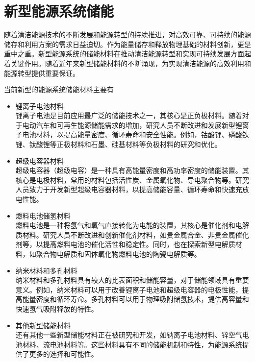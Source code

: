 \section{新型能源系统储能}
随着清洁能源技术的不断发展和能源转型的持续推进，对高效可靠、可持续的能源储存和利用方案的需求日益迫切。作为能量储存和释放物理基础的材料创新，更是重中之重。新型能源系统的储能材料在推动清洁能源转型和实现可持续发展方面起着关键作用。随着近年来新型储能材料的不断涌现，为实现清洁能源的高效利用和能源转型提供重要保证。 

当前新型的能源系统储能材料主要有%

\begin{itemize}
	\item 锂离子电池材料\\
锂离子电池是目前应用最广泛的储能技术之一，其核心是正负极材料。随着对于电动汽车和可再生能源储能需求的增加，研究人员不断改进和发展新型锂离子电池材料，以提高能量密度、循环寿命和安全性能。例如，钴酸锂、磷酸铁锂、钛酸锂等正极材料和石墨、硅基材料等负极材料的研究和优化。

\item 超级电容器材料\\
超级电容器（超级电容）是一种具有高能量密度和高功率密度的储能装置。其核心是电极材料，常用的材料包括活性炭、金属氧化物、导电聚合物等。研究人员致力于开发新型超级电容器材料，以提高储能容量、循环寿命和快速充放电性能。

\item 燃料电池储氢材料\\
燃料电池是一种将氢气和氧气直接转化为电能的装置，其核心是催化剂和电解质材料。研究人员不断改进和创新催化剂材料，如贵金属合金、非贵金属催化剂等，以提高燃料电池的催化活性和稳定性。同时，也在探索新型电解质材料，如聚合物电解质和固体氧化物燃料电池的陶瓷电解质等。

\item 纳米材料和多孔材料\\
纳米材料和多孔材料具有较大的比表面积和储能容量，对于储能领域具有重要意义。例如，纳米材料可以用于改善锂离子电池和超级电容器的电极性能，提高能量密度和循环寿命。多孔材料可以用于物理吸附储氢技术，提供高容量和快速氢气吸附释放的特性。

\item 其他新型储能材料\\
还有其他一些新型储能材料正在被研究和开发，如钠离子电池材料、锌空气电池材料、流电池材料等。这些材料具有不同的储能机制和特性，为能源系统提供了更多的选择和可能性。
\end{itemize}


